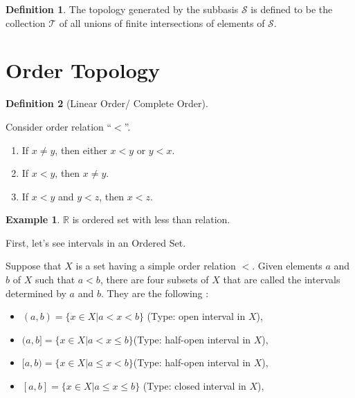 \documentclass[
]{book}
\providecommand{\tightlist}{%
  \setlength{\itemsep}{0pt}\setlength{\parskip}{0pt}}
\theoremstyle{definition}
\newtheorem{definition}{Definition}[chapter]
\theoremstyle{definition}
\newtheorem{example}{Example}[chapter]
\theoremstyle{definition}
\theoremstyle{definition}
\theoremstyle{remark}
\begin{document}
\begin{definition}
\protect\hypertarget{def:unnamed-chunk-19}{}\label{def:unnamed-chunk-19}The topology generated by the subbasis \(\mathcal{S}\) is defined to be the collection \(\mathcal{T}\) of all unions of finite intersections of elements of \(\mathcal{S}\).
\end{definition}

\hypertarget{order-topology}{%
\section{Order Topology}\label{order-topology}}

\begin{definition}[Linear Order/ Complete Order]
\protect\hypertarget{def:unnamed-chunk-20}{}\label{def:unnamed-chunk-20}

Consider order relation ``\(<\)''.

\begin{enumerate}
\def\labelenumi{\arabic{enumi}.}
\tightlist
\item
  If \(x \neq y\), then either \(x < y\) or \(y < x\).
\item
  If \(x < y\), then \(x\neq y\).
\item
  If \(x < y\) and \(y < z\), then \(x < z\).
\end{enumerate}

\end{definition}

\begin{example}
\protect\hypertarget{exm:unnamed-chunk-21}{}\label{exm:unnamed-chunk-21}\(\mathbb{R}\) is ordered set with less than relation.
\end{example}

First, let's see intervals in an Ordered Set.

Suppose that \(X\) is a set having a simple order relation \(<\). Given elements \(a\) and \(b\) of \(X\) such that \(a < b\), there are four subsets of \(X\) that are called the intervals determined by \(a\) and \(b\). They are the following :

\begin{itemize}
\tightlist
\item
  \((a, b) = \{x\in X | a < x < b\}\) (Type: open interval in \(X\)),
\item
  \((a, b] = \{x\in X | a < x ≤ b\}\)(Type: half-open interval in \(X\)),
\item
  \([a, b) = \{x\in X | a ≤ x < b\}\)(Type: half-open interval in \(X\)),
\item
  \([a, b] = \{x\in X | a ≤ x ≤ b\}\) (Type: closed interval in \(X\)),
\end{itemize}
\end{document}
